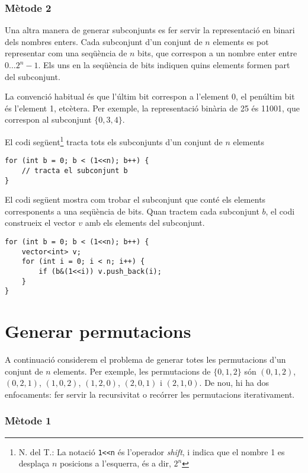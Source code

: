 \subsubsection{Mètode 2}

Una altra manera de generar subconjunts es fer servir
la representació en binari dels nombres enters.
Cada subconjunt d'un conjunt de $n$ elements
es pot representar com una seqüència de $n$ bits,
que correspon a un nombre enter entre $0 \ldots 2^n-1$.
Els uns en la seqüència de bits indiquen
quins elements formen part del subconjunt.

La convenció habitual és que
l'últim bit correspon a l'element 0,
el penúltim bit és l'element 1,
etcètera.
Per exemple, la representació binària de 25
és 11001, que correspon al subconjunt $\{0,3,4\}$.

El codi següent\footnote{N. del T.: La notació \texttt{1<<n} és l'operador \emph{shift}, i indica que el nombre 1 es desplaça $n$
posicions a l'esquerra, és a dir, $2^n$}
tracta tots els subconjunts d'un conjunt de $n$ elements

\begin{lstlisting}
for (int b = 0; b < (1<<n); b++) {
    // tracta el subconjunt b
}
\end{lstlisting}

El codi següent mostra com trobar el subconjunt que conté
els elements corresponents a una seqüència de bits.
Quan tractem cada subconjunt $b$, el codi construeix el vector
$v$ amb els elements del subconjunt.

\begin{lstlisting}
for (int b = 0; b < (1<<n); b++) {
    vector<int> v;
    for (int i = 0; i < n; i++) {
        if (b&(1<<i)) v.push_back(i);
    }
}
\end{lstlisting}

\section{Generar permutacions}


A continuació considerem el problema de generar
totes les permutacions d'un conjunt de $n$ elements.
Per exemple, les permutacions de $\{0,1,2\}$ són
$(0,1,2)$, $(0,2,1)$, $(1,0,2)$, $(1,2,0)$,
$(2,0,1)$ i $(2,1,0)$.
De nou, hi ha dos enfocaments:
fer servir la recursivitat o recórrer les permutacions
iterativament.

\subsubsection{Mètode 1}

